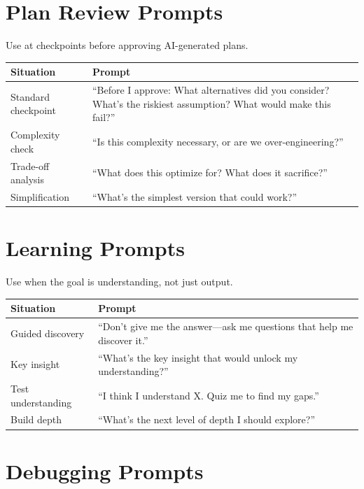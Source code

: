 \section{Plan Review Prompts}

Use at checkpoints before approving AI-generated plans.

\begin{table}[H]
\centering
\begin{tabular}{p{3cm}p{9cm}}
\toprule
\textbf{Situation} & \textbf{Prompt} \\
\midrule
Standard checkpoint & ``Before I approve: What alternatives did you consider? What's the riskiest assumption? What would make this fail?'' \\
Complexity check & ``Is this complexity necessary, or are we over-engineering?'' \\
Trade-off analysis & ``What does this optimize for? What does it sacrifice?'' \\
Simplification & ``What's the simplest version that could work?'' \\
\bottomrule
\end{tabular}
\end{table}

\section{Learning Prompts}

Use when the goal is understanding, not just output.

\begin{table}[H]
\centering
\begin{tabular}{p{3cm}p{9cm}}
\toprule
\textbf{Situation} & \textbf{Prompt} \\
\midrule
Guided discovery & ``Don't give me the answer---ask me questions that help me discover it.'' \\
Key insight & ``What's the key insight that would unlock my understanding?'' \\
Test understanding & ``I think I understand X. Quiz me to find my gaps.'' \\
Build depth & ``What's the next level of depth I should explore?'' \\
\bottomrule
\end{tabular}
\end{table}

\section{Debugging Prompts}

